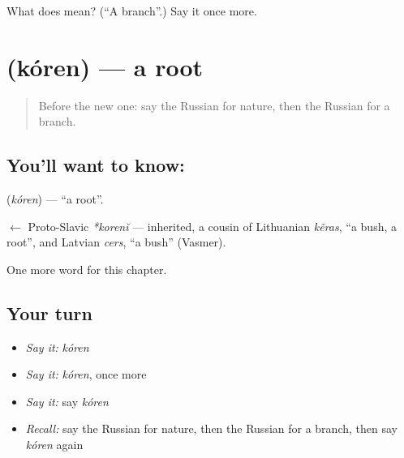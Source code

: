 \begin{tcolorbox}[breakable,colback=teal!4,colframe=teal!35!black,title={Before you move on}]
What does  mean? (\textquotedblleft{}A branch\textquotedblright{}.) Say it once more.
\end{tcolorbox}
\section[\texorpdfstring{\ru{корень} (kóren)}{корень (kóren)}]{ (kóren) — a root}

\label{lesson:RU-C195-koren}



\begin{quote}
Before the new one: say the Russian for nature, then the Russian for a branch.
\end{quote}

\subsection*{You'll want to know: }
\textbf{} (\emph{kóren}) — \textquotedblleft{}a root\textquotedblright{}.

\begin{cousinweb}
\textbf{} $\leftarrow$ Proto-Slavic \emph{*korenĭ} — inherited, a cousin of Lithuanian \emph{kẽras}, \textquotedblleft{}a bush, a root\textquotedblright{}, and Latvian \emph{cers}, \textquotedblleft{}a bush\textquotedblright{} (Vasmer).
\end{cousinweb}

\begin{grammarlens}[title={What you've built}]
One more word for this chapter.
\end{grammarlens}

\subsection*{Your turn}
\begin{itemize}
\raggedright
  \item \emph{Say it:} \emph{kóren}
  \item \emph{Say it:} \emph{kóren}, once more
  \item \emph{Say it:} say \emph{kóren}
  \item \emph{Recall:} say the Russian for nature, then the Russian for a branch, then say \emph{kóren} again
\end{itemize}

